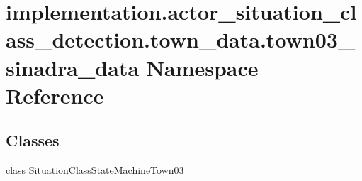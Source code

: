 \hypertarget{namespaceimplementation_1_1actor__situation__class__detection_1_1town__data_1_1town03__sinadra__data}{}\section{implementation.\+actor\+\_\+situation\+\_\+class\+\_\+detection.\+town\+\_\+data.\+town03\+\_\+sinadra\+\_\+data Namespace Reference}
\label{namespaceimplementation_1_1actor__situation__class__detection_1_1town__data_1_1town03__sinadra__data}
\subsection*{Classes}
\begin{DoxyCompactItemize}
\item 
class \hyperlink{classimplementation_1_1actor__situation__class__detection_1_1town__data_1_1town03__sinadra__data51d2866043798c330fb9ba17644a4a6f}{Situation\+Class\+State\+Machine\+Town03}
\end{DoxyCompactItemize}
